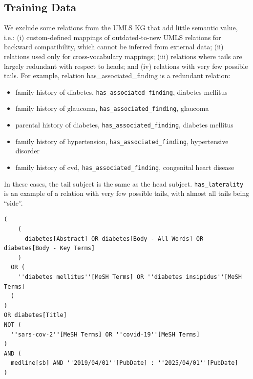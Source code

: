 \documentclass[10pt]{article}
\begin{document}
\begin{appendices}

\section{Training Data}
\label{app:training_data}
\setcounter{table}{0}
\renewcommand{\thetable}{A\arabic{table}}

\setcounter{figure}{0}
\renewcommand{\thefigure}{A\arabic{figure}}

We exclude some relations from the UMLS KG that add little semantic value, i.e.: (i) custom-defined mappings of outdated-to-new UMLS relations for backward compatibility, which cannot be inferred from external data; (ii) relations used only for cross-vocabulary mappings; (iii) relations where tails are largely redundant with respect to heads; and (iv) relations with very few possible tails. For example, relation has\_associated\_finding is a redundant relation:
\begin{itemize}[noitemsep,leftmargin=*]
  \item family history of diabetes, \texttt{has\_associated\_finding}, diabetes mellitus
  \item family history of glaucoma, \texttt{has\_associated\_finding}, glaucoma
  \item parental history of diabetes, \texttt{has\_associated\_finding}, diabetes mellitus
  \item family history of hypertension, \texttt{has\_associated\_finding}, hypertensive disorder
  \item family history of cvd, \texttt{has\_associated\_finding}, congenital heart disease
\end{itemize}
In these cases, the tail subject is the same as the head subject.
\texttt{has\_laterality} is an example of a relation with very few possible tails, with almost all tails being ``side''.

\begin{tcolorbox}[enhanced, breakable=false, colback=gray!5, boxrule=0pt]
\begin{lstlisting}[caption={PubMed search query},label={lst:pubmed-query}]
(
    (
      diabetes[Abstract] OR diabetes[Body - All Words] OR diabetes[Body - Key Terms]
    )
  OR (
    ''diabetes mellitus''[MeSH Terms] OR ''diabetes insipidus''[MeSH Terms]
  )
)
OR diabetes[Title]
NOT (
  ''sars-cov-2''[MeSH Terms] OR ''covid-19''[MeSH Terms]
)
AND (
  medline[sb] AND ''2019/04/01''[PubDate] : ''2025/04/01''[PubDate]
)
\end{lstlisting}
\end{tcolorbox}



\end{appendices}
\end{document}
